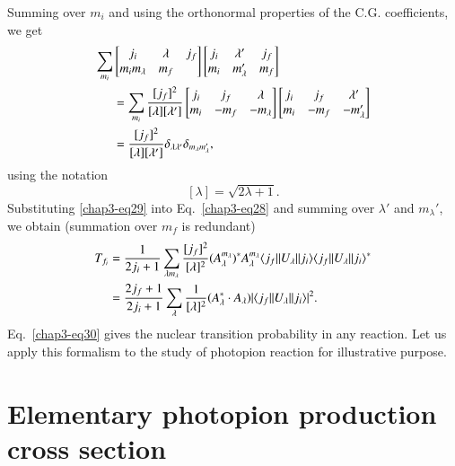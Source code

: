 Summing over $m_i$ and using the orthonormal properties of the C.G. coefficients, we get
\begin{align}
  \sum_{m_i} &
  \begin{bmatrix} j_i & \lambda & j_f\\ m_i m_\lambda & m_f  \end{bmatrix}
  \begin{bmatrix} j_i & \lambda' & j_f \\ m_i & m_\lambda' & m_f\end{bmatrix} \notag \\
    & = \sum_{m_i} \frac{[j_f]^2}{[\lambda][\lambda']}
      \begin{bmatrix} j_i &  j_f  & \lambda \\ m_i &  -m_f & -m_\lambda\end{bmatrix}
      \begin{bmatrix} j_i &  j_f  & \lambda' \\ m_i &  -m_f & -m_\lambda'\end{bmatrix} \notag \\
    & = \frac{[j_f]^2}{[\lambda][\lambda']} \delta_{\lambda \lambda'} \delta_{m_\lambda m_\lambda'}, \label{chap3-eq29}    
\end{align}
using the notation
$$
[\lambda] = \sqrt{2 \lambda +1}.
$$
Substituting \eqref{chap3-eq29} into Eq.\ \eqref{chap3-eq28} and summing over $\lambda'$ and $m_\lambda'$, we obtain (summation over $m_f$ is redundant)
\begin{align}
  T_{f_i} & = \frac{1}{2j_i +1} \sum_{\lambda m_\lambda} \frac{[j_f]^2}{[\lambda]^2} (A_\lambda^{m_\lambda})^\ast A_\lambda^{m_\lambda} \langle j_f || U_\lambda || j_i \rangle \langle j_f || U_\lambda || j_i \rangle^\ast \notag \\
  & = \frac{2j_f+1}{2j_i+1} \sum_{\lambda} \frac{1}{[\lambda]^2} (A_\lambda^\ast \cdot A_\lambda)| \langle j_f || U_\lambda || j_i \rangle |^2. \label{chap3-eq30}
\end{align}
Eq.\ \eqref{chap3-eq30} gives the nuclear transition probability in any reaction. Let us apply this formalism to the study of photopion reaction for illustrative purpose.

\section{Elementary photopion production cross section}\label{chap3-sec4}


